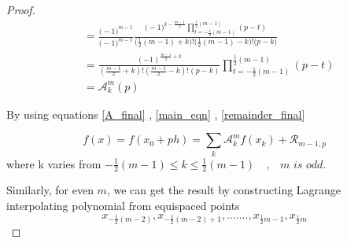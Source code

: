 \documentclass{article}
\begin{document}
\begin{proof}
\begin{equation} \label{A_final}
\begin{split}
&=
\frac{
\Big(  -1  \Big)^{m-1}    
}{
\Big(  -1  \Big)^{m-1}    
}
\frac{
\Big(  -1  \Big)^{k-\frac{m-1}{2}}    
\prod_{t = -\frac{1}{2}(m-1) }^{\frac{1}{2}(m-1)}  (p-t)
}{
\Big( \frac{1}{2}(m-1) +k \Big)! 
\Big( \frac{1}{2}(m-1) -k \Big)! 
\Big( p - k \Big)
}
\\
&=
\frac{ (-1)^{\frac{m-1}{2}+k} }{
(\frac{m-1}{2} + k)!
(\frac{m-1}{2} - k)!
(p-k)}
\prod_{t = -\frac{1}{2}(m-1) }^{\frac{1}{2}(m-1)}  (p-t)
\\
&=
\mathcal{A}_{k}^{m}(p)
\end{split}
\end{equation}

By using equations \ref{A_final} , \ref{main_eqn} , \ref{remainder_final}

$$
f(x) = f(x_0 + ph) = \sum_{k} \mathcal{A}_{k}^{m} f(x_k) + \mathcal{R}_{m-1,p}
$$
where k varies from $-\frac{1}{2}(m-1) \leq k \leq \frac{1}{2}(m-1)  \quad  \textit{,} \quad
\textit{m is odd} $.
\vspace{5mm}


Similarly, for even $m$, we can get the result by constructing Lagrange interpolating polynomial from equispaced points 
$$
x_{-\frac{1}{2}(m-2)} , x_{-\frac{1}{2}(m-2)+1} , .......
, x_{\frac{1}{2}m-1} , x_{\frac{1}{2}m}
$$

\end{proof}













\nocite{*}


\end{document}
